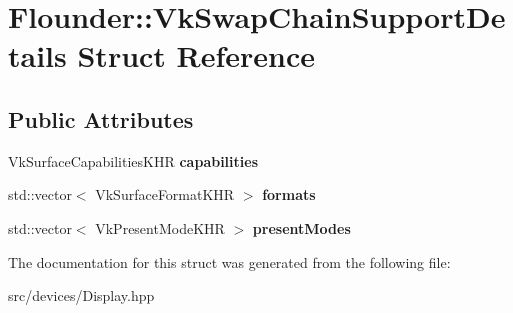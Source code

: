 \hypertarget{struct_flounder_1_1_vk_swap_chain_support_details}{}\section{Flounder\+:\+:Vk\+Swap\+Chain\+Support\+Details Struct Reference}
\label{struct_flounder_1_1_vk_swap_chain_support_details}
\subsection*{Public Attributes}
\begin{DoxyCompactItemize}
\item 
\mbox{\label{struct_flounder_1_1_vk_swap_chain_support_details_a08657b899d4fcb4ac5784426638d0614}} 
Vk\+Surface\+Capabilities\+K\+HR {\bfseries capabilities}
\item 
\mbox{\label{struct_flounder_1_1_vk_swap_chain_support_details_a912baa3aa046288e3a4124a52a96e260}} 
std\+::vector$<$ Vk\+Surface\+Format\+K\+HR $>$ {\bfseries formats}
\item 
\mbox{\label{struct_flounder_1_1_vk_swap_chain_support_details_a2b0085fc999631f3a43b3f31464fe2ab}} 
std\+::vector$<$ Vk\+Present\+Mode\+K\+HR $>$ {\bfseries present\+Modes}
\end{DoxyCompactItemize}


The documentation for this struct was generated from the following file\+:\begin{DoxyCompactItemize}
\item 
src/devices/Display.\+hpp\end{DoxyCompactItemize}
